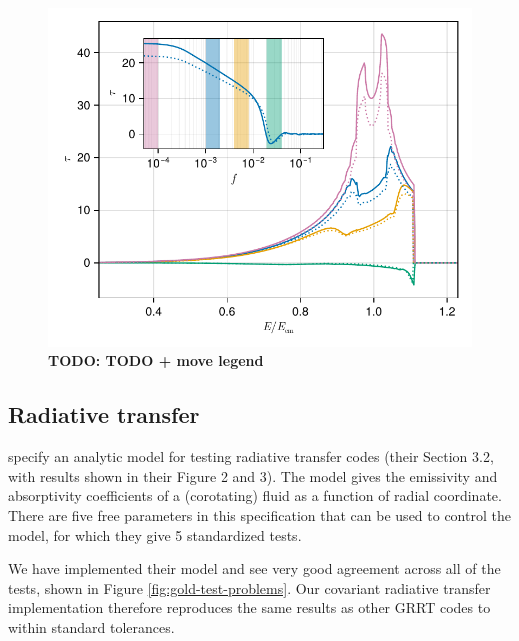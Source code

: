 \documentclass[fleqn,usenatbib]{mnras}
\newcommand{\todo}[1]{{\noindent \bf \color{red} TODO: #1}}
\begin{document}
\begin{figure}
	\centering
	\includegraphics[width=0.98\linewidth]{figures/reverberation.lag-energy.pdf}
	\caption{\todo{TODO + move legend}}
	\label{fig:lag-energy}
\end{figure}


\subsection{Radiative transfer}

\cite{gold_verification_2020} specify an analytic model for testing radiative
transfer codes (their Section 3.2, with results shown in their Figure 2 and 3).
The model gives the emissivity and absorptivity coefficients of a (corotating)
fluid as a function of radial coordinate. There are five free parameters in this
specification that can be used to control the model, for which they give 5
standardized tests.

We have implemented their model and see very good agreement across all of the
tests, shown in Figure \ref{fig:gold-test-problems}. Our covariant radiative
transfer implementation therefore reproduces the same results as other GRRT
codes to within standard tolerances.
\end{document}
